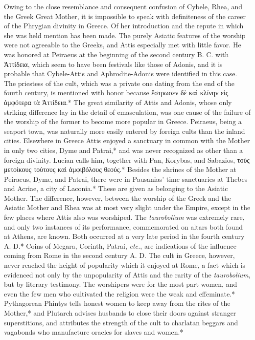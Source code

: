 \documentclass[a4paper, 11pt, oneside, polutonikogreek, english]{article}
\begin{document}
Owing to the close resemblance and consequent confusion of Cybele, Rhea, and the Greek Great Mother, it is impossible to speak with definiteness of the career of the Phrygian divinity in Greece. Of her introduction and the repute in which she was held mention has been made. The purely Asiatic features of the worship were not agreeable to the Greeks, and Attis especially met with little favor. He was honored at Peiraeus at the beginning of the second century B. C. with Ἀττίδεια, which seem to have been festivals like those of Adonis, and it is probable that Cybele-Attis and Aphrodite-Adonis were identified in this case. The priestess of the cult, which was a private one dating from the end of the fourth century, is mentioned with honor because ἔστρωσεν δὲ καὶ κλίνην εἰς ἀμφότερα τὰ Ἀττίδεια.* The great similarity of Attis and Adonis, whose only striking difference lay in the detail of emasculation, was one cause of the failure of the worship of the former to become more popular in Greece. Peiraeus, being a seaport town, was naturally more easily entered by foreign cults than the inland cities. Elsewhere in Greece Attis enjoyed a sanctuary in common with the Mother in only two cities, Dyme and Patrai,* and was never recognized as other than a foreign divinity. Lucian calls him, together with Pan, Korybas, and Sabazios, τοὺς μετοίκους τούτους καὶ ἀμφιβόλους θεούς.* Besides the shrines of the Mother at Peiraeus, Dyme, and Patrai, there were in Pausanias' time sanctuaries at Thebes and Acriae, a city of Laconia.* These are given as belonging to the Asiatic Mother. The difference, however, between the worship of the Greek and the Asiatic Mother and Rhea was at most very slight under the Empire, except in the few places where Attis also was worshiped. The \emph{taurobolium} was extremely rare, and only two instances of its performance, commemorated on altars both found at Athens, are known. Both occurred at a very late period in the fourth century A. D.* Coins of Megara, Corinth, Patrai, \emph{etc.}, are indications of the influence coming from Rome in the second century A. D. The cult in Greece, however, never reached the height of popularity which it enjoyed at Rome, a fact which is evidenced not only by the unpopularity of Attis and the rarity of the \emph{taurobolium}, but by literary testimony. The worshipers were for the most part women, and even the few men who cultivated the religion were the weak and effeminate.* Pythagorean Phintys tells honest women to keep away from the rites of the Mother,* and Plutarch advises husbands to close their doors against stranger superstitions, and attributes the strength of the cult to charlatan beggars and vagabonds who manufacture oracles for slaves and women.*
\end{document}

